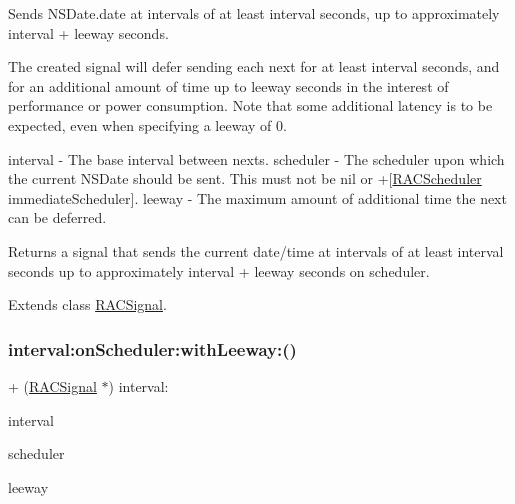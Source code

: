 Sends N\+S\+Date.\+date at intervals of at least {\ttfamily interval} seconds, up to approximately {\ttfamily interval} + {\ttfamily leeway} seconds.

The created signal will defer sending each {\ttfamily next} for at least {\ttfamily interval} seconds, and for an additional amount of time up to {\ttfamily leeway} seconds in the interest of performance or power consumption. Note that some additional latency is to be expected, even when specifying a {\ttfamily leeway} of 0.

interval -\/ The base interval between {\ttfamily next}s. scheduler -\/ The scheduler upon which the current N\+S\+Date should be sent. This must not be nil or +\mbox{[}\mbox{\hyperlink{interface_r_a_c_scheduler}{R\+A\+C\+Scheduler}} immediate\+Scheduler\mbox{]}. leeway -\/ The maximum amount of additional time the {\ttfamily next} can be deferred.

Returns a signal that sends the current date/time at intervals of at least {\ttfamily interval seconds} up to approximately {\ttfamily interval} + {\ttfamily leeway} seconds on {\ttfamily scheduler}. 

Extends class \mbox{\hyperlink{interface_r_a_c_signal_acd968c129ec1afe3b5bc77db5fc13291}{R\+A\+C\+Signal}}.

\mbox{\label{category_r_a_c_signal_07_operations_08_acd968c129ec1afe3b5bc77db5fc13291}} 
\subsubsection{\texorpdfstring{interval\+:on\+Scheduler\+:with\+Leeway\+:()}{interval:onScheduler:withLeeway:()}\hspace{0.1cm}{\footnotesize\ttfamily [3/3]}}
{\footnotesize\ttfamily + (\mbox{\hyperlink{interface_r_a_c_signal}{R\+A\+C\+Signal}} $\ast$) interval\+: \begin{DoxyParamCaption}\item[{(N\+S\+Time\+Interval)}]{interval }\item[{onScheduler:(\mbox{\hyperlink{interface_r_a_c_scheduler}{R\+A\+C\+Scheduler}} $\ast$)}]{scheduler }\item[{withLeeway:(N\+S\+Time\+Interval)}]{leeway }\end{DoxyParamCaption}}

